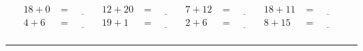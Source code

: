 \documentclass{article}
\begin{document}
\begin{sloppy}
\begin{align*}
    {18} + {0} &= \underline{\hspace{1cm}} & {12} + {20} &= \underline{\hspace{1cm}} & {7} + {12} &= \underline{\hspace{1cm}} & {18} + {11} &= \underline{\hspace{1cm}} \\
    {4} + {6} &= \underline{\hspace{1cm}} & {19} + {1} &= \underline{\hspace{1cm}} & {2} + {6} &= \underline{\hspace{1cm}} & {8} + {15} &= \underline{\hspace{1cm}} \\
\end{align*}
\hrule
\end{sloppy}
\end{document}
